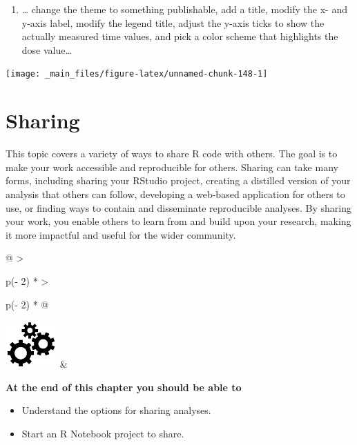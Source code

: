 \documentclass[
]{book}
\providecommand{\tightlist}{%
  \setlength{\itemsep}{0pt}\setlength{\parskip}{0pt}}
\begin{document}
\begin{enumerate}
\def\labelenumi{\arabic{enumi}.}
\setcounter{enumi}{4}
\tightlist
\item
  \ldots{} change the theme to something publishable, add a title, modify the x- and y-axis label, modify the legend title, adjust the y-axis ticks to show the actually measured time values, and pick a color scheme that highlights the dose value\ldots{}
\end{enumerate}

\begin{center}\texttt{[image: \_main\_files/figure-latex/unnamed-chunk-148-1]} \end{center}

\hypertarget{sharing}{%
\chapter{Sharing}\label{sharing}}

This topic covers a variety of ways to share R code with others. The goal is to make your work accessible and reproducible for others. Sharing can take many forms, including sharing your RStudio project, creating a distilled version of your analysis that others can follow, developing a web-based application for others to use, or finding ways to contain and disseminate reproducible analyses. By sharing your work, you enable others to learn from and build upon your research, making it more impactful and useful for the wider community.

\hfill\break

\begin{longtable}[]{@{}
  >{\raggedright\arraybackslash}p{(\columnwidth - 2\tabcolsep) * }
  >{\raggedright\arraybackslash}p{(\columnwidth - 2\tabcolsep) * }@{}}
\toprule\noalign{}
\endhead
\bottomrule\noalign{}
\endlastfoot
\includegraphics[width=\textwidth,height=0.70833in]{images/03.png} & \begin{minipage}[t]{\linewidth}\raggedright
\textbf{At the end of this chapter you should be able to}

\begin{itemize}
\item
  Understand the options for sharing analyses.
\item
  Start an R Notebook project to share.
\end{itemize}
\end{minipage} \\
\end{longtable}
\end{document}

